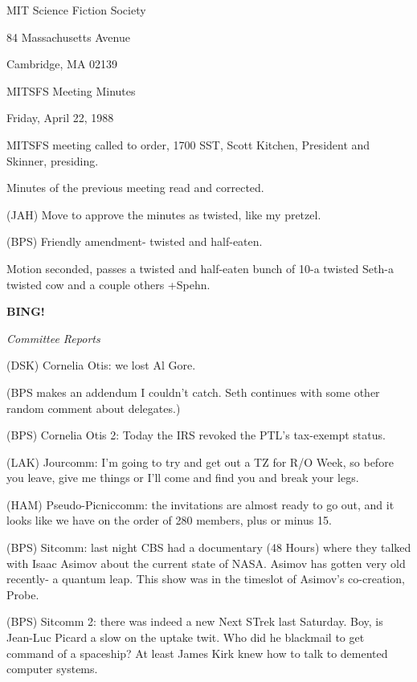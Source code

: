 \documentclass[12pt]{article}
\newcommand{\bing}{{\bf BING!} }
\newcommand{\goto}[1]{\bing \vskip 12pt \centerline{{\em{#1}}}}
\begin{document}
\begin{center}

MIT Science Fiction Society 

84 Massachusetts Avenue

Cambridge, MA 02139

\vspace{12pt}

MITSFS Meeting Minutes 

Friday, April 22, 1988

\end{center}
 
\vspace{18pt}

\setlength{\parskip}{6pt}

\noindent
MITSFS meeting called to order, 1700 SST,
Scott Kitchen, President and Skinner, presiding.

Minutes of the previous meeting read and corrected.

(JAH) Move to approve the minutes as twisted, like my pretzel.

(BPS) Friendly amendment- twisted and half-eaten.

Motion seconded, passes a twisted and half-eaten bunch of 10-a twisted Seth-a twisted cow and a couple others +Spehn.

\goto{Committee Reports}

(DSK) Cornelia Otis: we lost Al Gore.

(BPS makes an addendum I couldn't catch. Seth continues with some other random comment about delegates.)

(BPS) Cornelia Otis 2: Today the IRS revoked the PTL's tax-exempt status.

(LAK) Jourcomm: I'm going to try and get out a TZ for R/O Week, so before you leave, give me things or I'll come and find you and break your legs.

(HAM) Pseudo-Picniccomm: the invitations are almost ready to go out, and it looks like we have on the order of 280 members, plus or minus 15.

(BPS) Sitcomm: last night CBS had a documentary (48 Hours) where they talked with Isaac Asimov about the current state of NASA. Asimov has gotten very old recently- a quantum leap. This show was in the timeslot of Asimov's co-creation, Probe.

(BPS) Sitcomm 2: there was indeed a new Next STrek last Saturday. Boy, is Jean-Luc Picard a slow on the uptake twit. Who did he blackmail to get command of a spaceship? At least James Kirk knew how to talk to demented computer systems.
\end{document}
